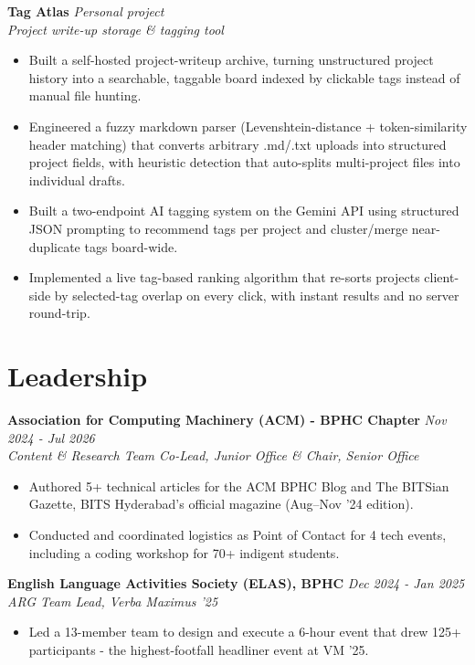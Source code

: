 \documentclass[10pt,letterpaper]{article}
\newcommand{\head}[2]{{\bfseries #1} \hfill {\itshape #2}\\}
\newcommand{\subline}[1]{{\itshape #1}\\[2pt]}
\begin{document}
\par\vspace{9pt}
\head{Tag Atlas }{Personal project}
\subline{Project write-up storage \& tagging tool}
\vspace{-8pt}
\begin{itemize}
\item Built a self-hosted project-writeup archive, turning unstructured project history into a searchable, taggable board indexed by clickable tags instead of manual file hunting.
\item Engineered a fuzzy markdown parser (Levenshtein-distance + token-similarity header matching) that converts arbitrary .md/.txt uploads into structured project fields, with heuristic detection that auto-splits multi-project files into individual drafts.
\item Built a two-endpoint AI tagging system on the Gemini API using structured JSON prompting to recommend tags per project and cluster/merge near-duplicate tags board-wide.
\item Implemented a live tag-based ranking algorithm that re-sorts projects client-side by selected-tag overlap on every click, with instant results and no server round-trip.
\end{itemize}
\par\vspace{9pt}
\section*{Leadership}
\head{Association for Computing Machinery (ACM) - BPHC Chapter}{Nov 2024 - Jul 2026}
\subline{Content \& Research Team Co-Lead, Junior Office \& Chair, Senior Office}
\vspace{-8pt}
\begin{itemize}
\item Authored 5+ technical articles for the ACM BPHC Blog and The BITSian Gazette, BITS Hyderabad's official magazine (Aug--Nov '24 edition).
\item Conducted and coordinated logistics as Point of Contact for 4 tech events, including a coding workshop for 70+ indigent students.
\end{itemize}
\par\vspace{9pt}
\head{English Language Activities Society (ELAS), BPHC}{Dec 2024 - Jan 2025}
\subline{ARG Team Lead, Verba Maximus '25}
\vspace{-8pt}
\begin{itemize}
\item Led a 13-member team to design and execute a 6-hour event that drew 125+ participants - the highest-footfall headliner event at VM '25.
\end{itemize}
\par\vspace{9pt}
\end{document}
